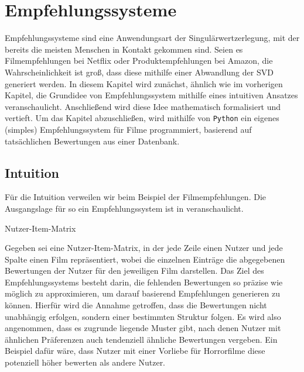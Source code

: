 \chapter{Empfehlungssysteme}

Empfehlungssysteme sind eine Anwendungsart der Singulärwertzerlegung, mit der bereits die meisten Menschen in Kontakt gekommen sind.
Seien es Filmempfehlungen bei Netflix oder Produktempfehlungen bei Amazon, die Wahrscheinlichkeit ist groß, dass diese mithilfe einer Abwandlung der SVD generiert werden.
In diesem Kapitel wird zunächst, ähnlich wie im vorherigen Kapitel, die Grundidee von Empfehlungssystem mithilfe eines intuitiven Ansatzes veranschaulicht.
Anschließend wird diese Idee mathematisch formalisiert und vertieft.
Um das Kapitel abzuschließen, wird mithilfe von \texttt{Python} ein eigenes (simples) Empfehlungssystem für Filme programmiert, basierend auf tatsächlichen Bewertungen aus einer Datenbank.

\section{Intuition}

Für die Intuition verweilen wir beim Beispiel der Filmempfehlungen.
Die Ausgangslage für so ein Empfehlungssystem ist in  veranschaulicht.
\begin{table}[tb]
    \centering
    \caption{Nutzer-Item-Matrix}\label{tab:rec:usit}
    
\end{table}

Gegeben sei eine Nutzer-Item-Matrix, in der jede Zeile einen Nutzer und jede Spalte einen Film repräsentiert, wobei die einzelnen Einträge die abgegebenen Bewertungen der Nutzer für den jeweiligen Film darstellen.
Das Ziel des Empfehlungssystems besteht darin, die fehlenden Bewertungen so präzise wie möglich zu approximieren, um darauf basierend Empfehlungen generieren zu können.
Hierfür wird die Annahme getroffen, dass die Bewertungen nicht unabhängig erfolgen, sondern einer bestimmten Struktur folgen.
Es wird also angenommen, dass es zugrunde liegende Muster gibt, nach denen Nutzer mit ähnlichen Präferenzen auch tendenziell ähnliche Bewertungen vergeben.
Ein Beispiel dafür wäre, dass Nutzer mit einer Vorliebe für Horrorfilme diese potenziell höher bewerten als andere Nutzer.


